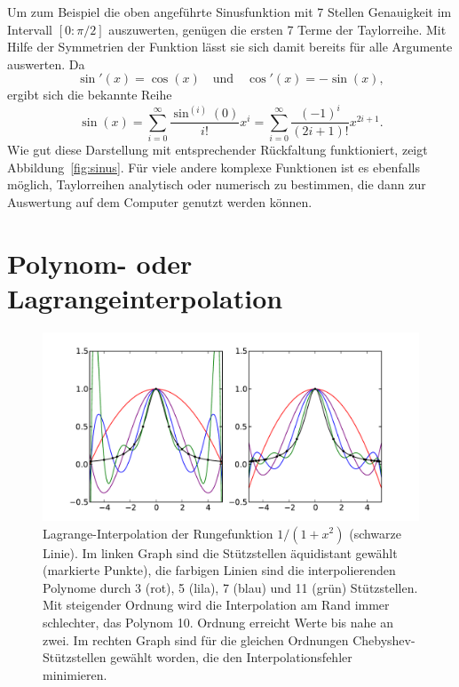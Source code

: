 Um  zum  Beispiel die  oben  angeführte  Sinusfunktion  mit 7  Stellen
Genauigkeit im Intervall $[0:\pi/2]$  auszuwerten, genügen die ersten 7
Terme der Taylorreihe. Mit Hilfe der Symmetrien der Funktion lässt sie
sich damit bereits für alle Argumente auswerten. Da
\begin{equation*}
  \sin'(x) = \cos(x) \quad\text{und} \quad \cos'(x) = -\sin(x),
\end{equation*}
ergibt sich die bekannte Reihe
\begin{equation}
  \sin(x) = \sum_{i=0}^\infty \frac{\sin^{(i)}(0)}{i!} x^i =
  \sum_{i=0}^\infty \frac{(-1)^i}{(2i+1)!} x^{2i+1}.
\end{equation}
Wie gut diese Darstellung mit entsprechender Rückfaltung funktioniert,
zeigt Abbildung~\ref{fig:sinus}.  Für viele andere komplexe Funktionen
ist es ebenfalls möglich, Taylorreihen analytisch oder numerisch zu
bestimmen, die dann zur Auswertung auf dem Computer genutzt werden
können.

\section{Polynom- oder Lagrangeinterpolation}

\begin{figure}
  \centering
  \includegraphics[width=\textwidth]{plots/runge_lagrange}
  \caption{Lagrange-Interpolation der Rungefunktion $1/(1+x^2)$
    (schwarze Linie). Im linken Graph sind die Stützstellen
    äquidistant gewählt (markierte Punkte), die farbigen Linien sind
    die interpolierenden Polynome durch 3 (rot), 5 (lila), 7 (blau)
    und 11 (grün) Stützstellen. Mit steigender Ordnung wird die
    Interpolation am Rand immer schlechter, das Polynom 10. Ordnung
    erreicht Werte bis nahe an zwei. Im rechten Graph sind
    für die gleichen Ordnungen Chebyshev-Stützstellen gewählt worden,
    die den Interpolationsfehler minimieren.}
  \label{fig:runge}
\end{figure}


